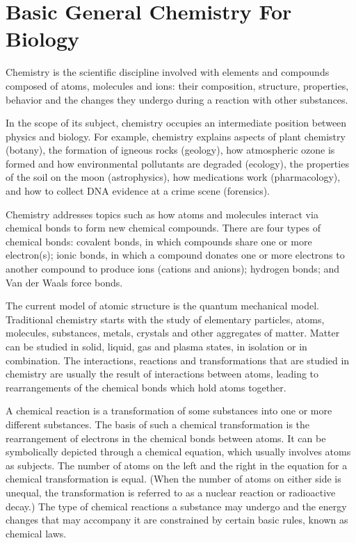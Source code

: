 \documentclass[
]{article}
\author{}
\date{}
\begin{document}
\hypertarget{basic-general-chemistry-for-biology}{%
\section{Basic General Chemistry For
Biology}\label{basic-general-chemistry-for-biology}}

Chemistry is the scientific discipline involved with elements and
compounds composed of atoms, molecules and ions: their composition,
structure, properties, behavior and the changes they undergo during a
reaction with other substances.

In the scope of its subject, chemistry occupies an intermediate position
between physics and biology. For example, chemistry explains aspects of
plant chemistry (botany), the formation of igneous rocks (geology), how
atmospheric ozone is formed and how environmental pollutants are
degraded (ecology), the properties of the soil on the moon
(astrophysics), how medications work (pharmacology), and how to collect
DNA evidence at a crime scene (forensics).

Chemistry addresses topics such as how atoms and molecules interact via
chemical bonds to form new chemical compounds. There are four types of
chemical bonds: covalent bonds, in which compounds share one or more
electron(s); ionic bonds, in which a compound donates one or more
electrons to another compound to produce ions (cations and anions);
hydrogen bonds; and Van der Waals force bonds.

The current model of atomic structure is the quantum mechanical model.
Traditional chemistry starts with the study of elementary particles,
atoms, molecules, substances, metals, crystals and other aggregates of
matter. Matter can be studied in solid, liquid, gas and plasma states,
in isolation or in combination. The interactions, reactions and
transformations that are studied in chemistry are usually the result of
interactions between atoms, leading to rearrangements of the chemical
bonds which hold atoms together.

A chemical reaction is a transformation of some substances into one or
more different substances. The basis of such a chemical transformation
is the rearrangement of electrons in the chemical bonds between atoms.
It can be symbolically depicted through a chemical equation, which
usually involves atoms as subjects. The number of atoms on the left and
the right in the equation for a chemical transformation is equal. (When
the number of atoms on either side is unequal, the transformation is
referred to as a nuclear reaction or radioactive decay.) The type of
chemical reactions a substance may undergo and the energy changes that
may accompany it are constrained by certain basic rules, known as
chemical laws.
\end{document}

